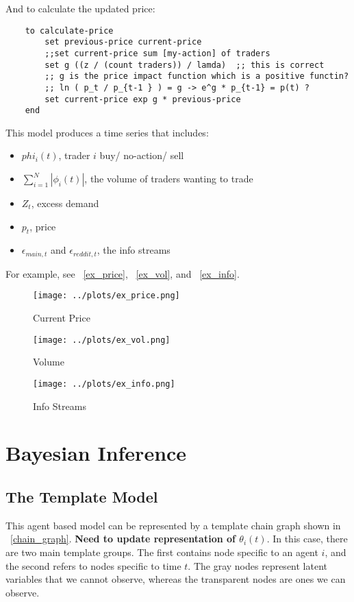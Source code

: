 \documentclass[a4paper, 11pt]{report}
\begin{document}
	And to calculate the updated price:
	\begin{lstlisting}
	to calculate-price
		set previous-price current-price
		;;set current-price sum [my-action] of traders
		set g ((z / (count traders)) / lamda)  ;; this is correct
		;; g is the price impact function which is a positive functin?
		;; ln ( p_t / p_{t-1 } ) = g -> e^g * p_{t-1} = p(t) ?
		set current-price exp g * previous-price
	end
	\end{lstlisting}
	
	This model produces a time series that includes:
	\begin{itemize}
		\item $phi_{i}(t)$, trader $i$ buy/ no-action/ sell
		\item $\sum_{i=1}^{N} | \phi_{i}(t) |$, the volume of traders wanting to trade
		\item $Z_{t}$, excess demand
		\item $p_{t}$, price
		\item $\epsilon_{main,t}$ and $\epsilon_{reddit,t}$, the info streams
	\end{itemize}

	For example, see ~\autoref{ex_price}, ~\autoref{ex_vol}, and ~\autoref{ex_info}.
\begin{figure}[h!]
	\caption{Current Price}
	\label{ex_price}
	\texttt{[image: ../plots/ex\_price.png]}
\end{figure}

\begin{figure}[h!]
	\caption{Volume}
	\label{ex_vol}
	\texttt{[image: ../plots/ex\_vol.png]}
\end{figure}

\begin{figure}[h!]
	\caption{Info Streams}
	\label{ex_info}
	\texttt{[image: ../plots/ex\_info.png]}
\end{figure}

\chapter{Bayesian Inference}	
\section{The Template Model}
This agent based model can be represented by a template chain graph shown in ~\autoref{chain_graph}. \textbf{Need to update representation of $\theta_{i}(t)$}. In this case, there are two main template groups. The first contains node specific to an agent $i$, and the second refers to nodes specific to time $t$. The gray nodes represent latent variables that we cannot observe, whereas the transparent nodes are ones we can observe. 
\end{document}
